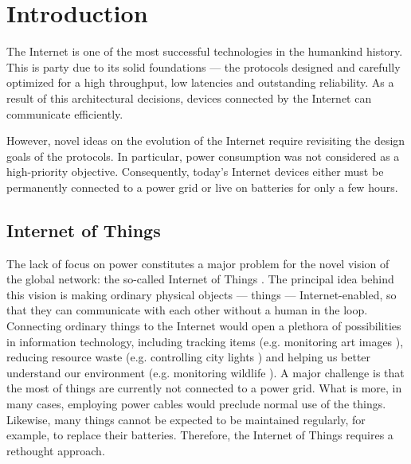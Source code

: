 \chapter{Introduction}
\label{ch:intro}

The Internet is one of the most successful technologies in the humankind history.
This is party due to its solid foundations --- the protocols designed and carefully optimized for a high throughput, low latencies and outstanding reliability.
As a result of this architectural decisions, devices connected by the Internet can communicate efficiently.

However, novel ideas on the evolution of the Internet require revisiting the design goals of the protocols.
In particular, power consumption was not considered as a high-priority objective.
Consequently, today's Internet devices either must be permanently connected to a power grid or live on batteries for only a few hours.

\section{Internet of Things}

The lack of focus on power constitutes a major problem for the novel vision of the global network: the so-called Internet of Things \cite{InternetOfThings}.
The principal idea behind this vision is making ordinary physical objects --- things --- Internet-enabled, so that they can communicate with each other without a human in the loop.
Connecting ordinary things to the Internet would open a plethora of possibilities in information technology, including tracking items (e.g. monitoring art images \cite{GuArtNet}), reducing resource waste (e.g. controlling city lights \cite{singhvi2005intelligent}) and helping us better understand our environment (e.g. monitoring wildlife \cite{liu2009long}).
A major challenge is that the most of things are currently not connected to a power grid.
What is more, in many cases, employing power cables would preclude normal use of the things.
Likewise, many things cannot be expected to be maintained regularly, for example, to replace their batteries.
Therefore, the Internet of Things requires a rethought approach.


